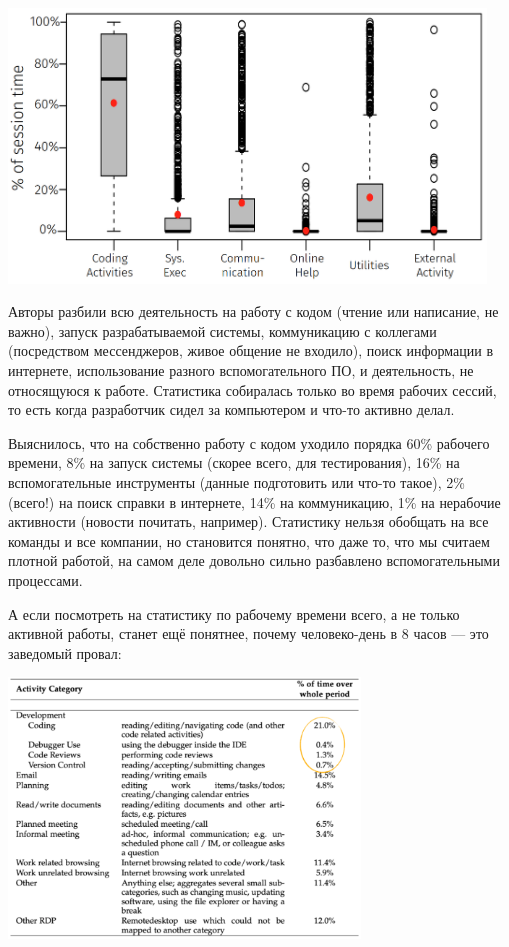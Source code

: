 \documentclass{../../text-style}
\begin{document}
\begin{center}
    \includegraphics[width=0.95\textwidth]{timeSpentDuringWorkingSession.png}
\end{center}

Авторы разбили всю деятельность на работу с кодом (чтение или написание, не важно), запуск разрабатываемой системы, коммуникацию с коллегами (посредством мессенджеров, живое общение не входило), поиск информации в интернете, использование разного вспомогательного ПО, и деятельность, не относящуюся к работе. Статистика собиралась только во время рабочих сессий, то есть когда разработчик сидел за компьютером и что-то активно делал.

Выяснилось, что на собственно работу с кодом уходило порядка 60\% рабочего времени, 8\% на запуск системы (скорее всего, для тестирования), 16\% на вспомогательные инструменты (данные подготовить или что-то такое), 2\% (всего!) на поиск справки в интернете, 14\% на коммуникацию, 1\% на нерабочие активности (новости почитать, например). Статистику нельзя обобщать на все команды и все компании, но становится понятно, что даже то, что мы считаем плотной работой, на самом деле довольно сильно разбавлено вспомогательными процессами.

А если посмотреть на статистику по рабочему времени всего, а не только активной работы, станет ещё понятнее, почему человеко-день в 8 часов --- это заведомый провал:

\begin{center}
    \includegraphics[width=0.7\textwidth]{timeSpentTotal.png}
\end{center}
\end{document}
